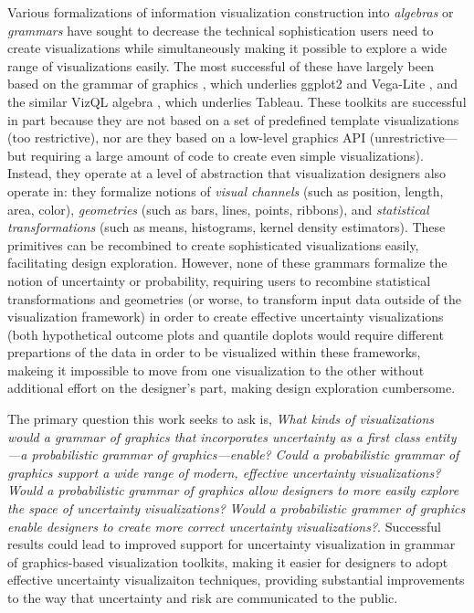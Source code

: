 \documentclass[11pt]{article}
\begin{document}
Various formalizations of information visualization construction into \emph{algebras} \cite{bertin1983semiology, mackinlay1986automating} or \emph{grammars} \cite{wilkinson_grammar_2005} have sought to decrease the technical sophistication users need to create visualizations while simultaneously making it possible to explore a wide range of visualizations easily. The most successful of these have largely been based on the grammar of graphics \cite{wilkinson_grammar_2005}, which underlies ggplot2 \cite{Wickham2010layered_grammar, wickham2016ggplot2} and Vega-Lite \cite{Satyanarayan2017vegalite}, and the similar VizQL algebra \cite{mackinlay2007show}, which underlies Tableau. These toolkits are successful in part because they are not based on a set of predefined template visualizations (too restrictive), nor are they based on a low-level graphics API (unrestrictive---but requiring a large amount of code to create even simple visualizations). Instead, they operate at a level of abstraction that visualization designers also operate in: they formalize notions of \emph{visual channels} (such as position, length, area, color), \emph{geometries} (such as bars, lines, points, ribbons), and \emph{statistical transformations} (such as means, histograms, kernel density estimators). These primitives can be recombined to create sophisticated visualizations easily, facilitating design exploration. However, none of these grammars formalize the notion of uncertainty or probability, requiring users to recombine statistical transformations and geometries (or worse, to transform input data outside of the visualization framework) in order to create effective uncertainty visualizations (both hypothetical outcome plots \cite{hullman2015hops, kale2018hypothetical} and quantile doplots \cite{kay2016bus, Fernandes2018} would require different prepartions of the data in order to be visualized within these frameworks, makeing it impossible to move from one visualization to the other without additional effort on the designer's part, making design exploration cumbersome.

The primary question this work seeks to ask is, \emph{What kinds of visualizations would a grammar of graphics that incorporates uncertainty as a first class entity---a probabilistic grammar of graphics---enable?} \emph{Could a probabilistic grammar of graphics support a wide range of modern, effective uncertainty visualizations?} \emph{Would a probabilistic grammar of graphics allow designers to more easily explore the space of uncertainty visualizations?} \emph{Would a probabilistic grammer of graphics enable designers to create more correct uncertainty visualizations?}. Successful results could lead to improved support for uncertainty visualization in grammar of graphics-based visualization toolkits, making it easier for designers to adopt effective uncertainty visualizaiton techniques, providing substantial improvements to the way that uncertainty and risk are communicated to the public.
\end{document}
